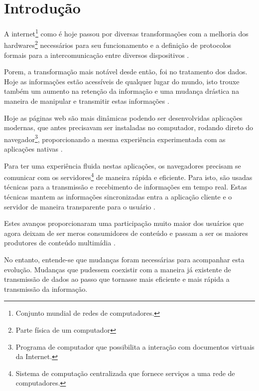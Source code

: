 \section{Introdução}


A internet\footnote{Conjunto mundial de redes de computadores.} como é hoje passou por diversas transformações com a melhoria dos hardwares\footnote{Parte física de um computador} necessários para seu funcionamento e a definição de protocolos formais para a intercomunicação entre diversos dispositivos \citep{Aghaei2012}.

Porem, a transformação mais notável desde então, foi no tratamento dos dados. Hoje as informações estão acessíveis de qualquer lugar do mundo, isto trouxe também um aumento na retenção da informação e uma mudança drástica na maneira de manipular e transmitir estas informações \citep{Leiner2009}.

Hoje as páginas web são mais dinâmicas podendo ser desenvolvidas aplicações modernas, que antes precisavam ser instaladas no computador, rodando direto do navegador\footnote{Programa de computador que possibilita a interação com documentos virtuais da Internet.},  proporcionando a mesma experiência experimentada com as aplicações nativas \citep{Garrett2005}.

Para ter uma experiência fluida nestas aplicações, os navegadores precisam se comunicar com os servidores\footnote{Sistema de computação centralizada que fornece serviços a uma rede de computadores.} de maneira rápida e eficiente. Para isto, são usadas técnicas para a transmissão e recebimento de informações em tempo real. Estas técnicas mantem as informações sincronizadas entra a aplicação cliente e o servidor de maneira transparente para o usuário \citep{offutt2002quality}.

Estes avanços proporcionaram uma participação muito maior dos usuários que agora deixam de ser meros consumidores de conteúdo e passam a ser os maiores produtores de conteúdo multimídia \citep{Aghaei2012}.

No entanto, entende-se que mudanças foram necessárias para acompanhar esta evolução. Mudanças que pudessem coexistir com a maneira já existente de transmissão de dados ao passo que tornasse mais eficiente e mais rápida a transmissão da informação.

